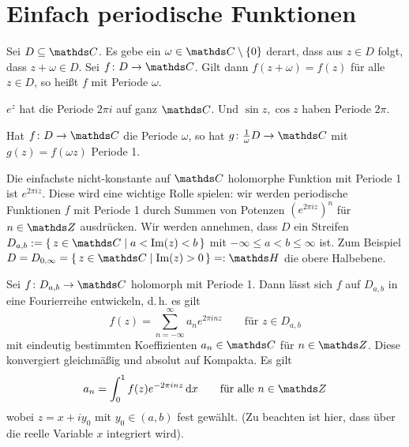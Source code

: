 \section{Einfach periodische Funktionen}

\begin{defi}
Sei $D \subseteq \CC$. Es gebe ein $\omega \in \CC\setminus\{0\}$ derart, dass aus $z\in D$ folgt, dass $z+\omega \in D$. Sei $f\colon D\ra \CC$. Gilt dann $f(z+\omega) = f(z)$ für alle $z \in D$, so heißt $f$  mit Periode $\omega$.
\end{defi}

\begin{bsp}
$e^z$ hat die Periode $2\pi i$ auf ganz $\CC$. Und $\sin z, \cos z$ haben Periode $2\pi$.
\end{bsp}

Hat $f\colon D \ra \CC$ die Periode $\omega$, so hat $g\colon \frac{1}{\omega}D \ra \CC$ mit $g(z) = f(\omega z)$ Periode 1.

Die einfachste nicht-konstante auf $\CC$ holomorphe Funktion mit Periode 1 ist $e^{2\pi i z}$.
Diese wird eine wichtige Rolle spielen: wir werden periodische Funktionen $f$ mit Periode 1 durch Summen von Potenzen $(e^{2\pi iz})^n$ für $n\in\ZZ$ ausdrücken.
Wir werden annehmen, dass $D$ ein Streifen $D_{a,b} := \Set{z\in \CC \mid a < \Im(z) < b}$ mit $-\infty \leq a < b \leq \infty$ ist.
Zum Beispiel $D = D_{0,\infty} = \Set{z\in\CC \mid \Im(z) > 0} =: \HH$ die obere Halbebene.

\begin{satz}\label{satz:fourierentwicklung}
Sei $f\colon D_{a,b} \ra \CC$ holomorph mit Periode 1.
Dann lässt sich $f$ auf $D_{a,b}$ in eine Fourierreihe entwickeln, d.\,h. es gilt
\[
	f(z)
	= \sum_{n=-\infty}^\infty a_ne^{2\pi inz}
	\qquad \text{für } z\in D_{a,b}
\]
mit eindeutig bestimmten Koeffizienten $a_n\in\CC$ für $n\in\ZZ$.
Diese konvergiert gleichmäßig und absolut auf Kompakta.
Es gilt
\[
	a_n = \int_0^1 f(z)e^{-2\pi inz} \opd x
	\qquad \text{für alle } n\in\ZZ
\]
wobei $z=x+iy_0$ mit $y_0\in (a,b)$ fest gewählt.
(Zu beachten ist hier, dass über die reelle Variable $x$ integriert wird).
\end{satz}

